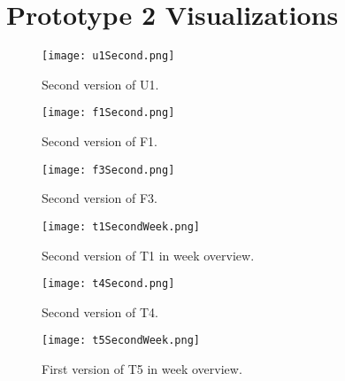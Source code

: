 \chapter{Prototype 2 Visualizations}
\label{prototype2Viz}

\begin{figure}[h!]
\centering
\texttt{[image: u1Second.png]}
\caption[Second version of U1]{Second version of U1.}
\end{figure}

\begin{figure}[h!]
\centering
\texttt{[image: f1Second.png]}
\caption[Second version of F1]{Second version of F1.}
\end{figure}

\begin{figure}[h!]
\centering
\texttt{[image: f3Second.png]}
\caption[Second version of F3]{Second version of F3.}
\end{figure}

\begin{figure}[h!]
\centering
\texttt{[image: t1SecondWeek.png]}
\caption[Second version of T1]{Second version of T1 in week overview.}
\end{figure}

\begin{figure}[h!]
\centering
\texttt{[image: t4Second.png]}
\caption[Second version of T4]{Second version of T4.}
\end{figure}

\begin{figure}[h!]
\centering
\texttt{[image: t5SecondWeek.png]}
\caption[First version of T5]{First version of T5 in week overview.}
\end{figure}
